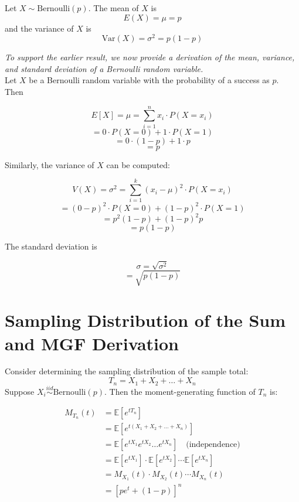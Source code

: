 \begin{definition}
Let \( X \sim \text{Bernoulli}(p) \). The mean of \( X \) is
\[
E(X) = \mu = p
\]
and the variance of \( X \) is
\[
\text{Var}(X) = \sigma^2 = p(1 - p)
\]
\end{definition} 
\textit{To support the earlier result, we now provide a derivation of the mean, variance, and standard deviation of a Bernoulli random variable.}
\vspace{1,0em}  \\
Let \( X \) be a Bernoulli random variable with the probability of a success as \( p \). Then

\[
E[X] = \mu = \sum_{i=1}^{n} x_i \cdot P(X = x_i)
\]
\[
= 0 \cdot P(X = 0) + 1 \cdot P(X = 1)
\]
\[
= 0 \cdot (1 - p) + 1 \cdot p
\]
\[
= p
\]

Similarly, the variance of \( X \) can be computed:

\[
V(X) = \sigma^2 = \sum_{i=1}^{k} (x_i - \mu)^2 \cdot P(X = x_i)
\]
\[
= (0 - p)^2 \cdot P(X = 0) + (1 - p)^2 \cdot P(X = 1)
\]
\[
= p^2 (1 - p) + (1 - p)^2 p
\]
\[
= p(1 - p)
\]

The standard deviation is

\[
\sigma = \sqrt{\sigma^2}
\]
\[
= \sqrt{p(1 - p)}
\]




\section{Sampling Distribution of the Sum and MGF Derivation}

Consider determining the sampling distribution of the sample total:
\[
T_n = X_1 + X_2 + \dots + X_n
\]
Suppose \( X_i \overset{iid}{\sim} \text{Bernoulli}(p) \). Then the moment-generating function of \( T_n \) is:

\begin{align*}
M_{T_n}(t) &= \mathbb{E}[e^{t T_n}] \\
           &= \mathbb{E}\left[e^{t(X_1 + X_2 + \dots + X_n)}\right] \\
           &= \mathbb{E}\left[e^{tX_1} e^{tX_2} \dots e^{tX_n} \right] \quad \text{(independence)} \\
           &= \mathbb{E}[e^{tX_1}] \cdot \mathbb{E}[e^{tX_2}] \cdots \mathbb{E}[e^{tX_n}] \\
           &= M_{X_1}(t) \cdot M_{X_2}(t) \cdots M_{X_n}(t) \\
           &= \left[pe^t + (1 - p)\right]^n
\end{align*}


